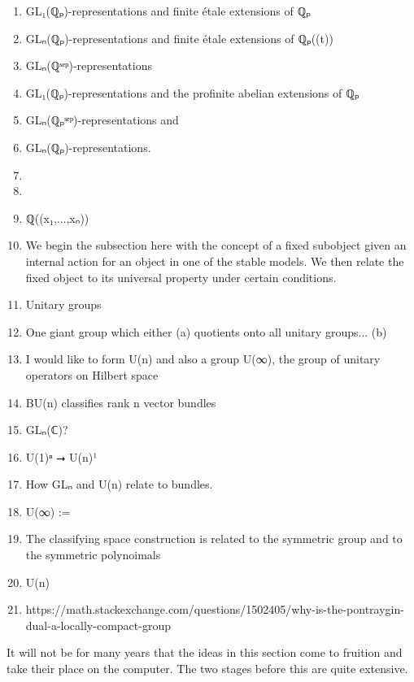\documentclass{book}
\begin{document}
\begin{enumerate}
\item GL₁(ℚₚ)-representations and finite étale extensions of ℚₚ
\item GLₙ(ℚₚ)-representations and finite étale extensions of ℚₚ((t))
\item GLₙ(ℚˢᵉᵖ)-representations
\item GL₁(ℚₚ)-representations and the profinite abelian extensions of ℚₚ
\item GLₙ(ℚₚˢᵉᵖ)-representations and 
\item GLₙ(ℚₚ)-representations.
\item \iffalse https://math.dartmouth.edu/~eassaf/Coloquium_talk_-_p-adic_Langlands \fi
\item \iffalse https://math.stackexchange.com/questions/4767180/local-fields-vs-self-pontryagin-dual-locally-compact-fields-with-self-dual-schw/4773432?noredirect=1#comment10142552_4773432 \fi
\item ℚ((x₁,...,xₙ))
\item We begin the subsection here with the concept of a fixed subobject given an internal action for an object in one of the stable models. We then relate the fixed object to its universal property under certain conditions.
\item Unitary groups
\item One giant group which either (a) quotients onto all unitary groups... (b)
\item I would like to form U(n) and also a group U(∞), the group of unitary operators on Hilbert space
\item BU(n) classifies rank n vector bundles
\item GLₙ(ℂ)?
\item U(1)ⁿ ⭢ U(n)¹
\item How GLₙ and U(n) relate to bundles.
\item U(∞) := 
\item The classifying space construction is related to the symmetric group and to the symmetric polynoimals
\item U(n)
\item https://math.stackexchange.com/questions/1502405/why-is-the-pontraygin-dual-a-locally-compact-group
\end{enumerate}

It will not be for many years that the ideas in this section come to fruition and take their place on the computer. The two stages before this are quite extensive.\\
\end{document}
